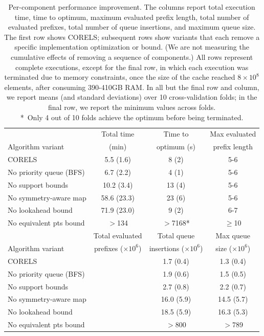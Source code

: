 \begin{table}[t!]
\centering
\begin{tabular}{l | c | c | c}
& Total time & Time to & Max evaluated \\
Algorithm variant & (min) & optimum (s) & prefix length \\
\hline
CORELS & 5.5 (1.6) & 8 (2) & 5-6 \\
No priority queue (BFS) & 6.7 (2.2) & 4 (1) & 5-6 \\
No support bounds & 10.2 (3.4) & 13 (4) & 5-6 \\
No symmetry-aware map & 58.6 (23.3) & 23 (6) & 5-6 \\
No lookahead bound & 71.9 (23.0) & 9 (2) & 6-7 \\
No equivalent pts bound & $>$134 & $>$7168* & $\ge$10 \\
\hline
\hline
 & Total evaluated & Total queue &  Max queue \\
Algorithm variant & prefixes ($\times 10^6$) & insertions ($\times 10^6$) & size ($\times 10^6$) \\
\hline
CORELS & & 1.7 (0.4) & 1.3 (0.4) \\
No priority queue (BFS) & & 1.9 (0.6) & 1.5 (0.5) \\
No support bounds  & & 2.7 (0.8) & 2.2 (0.7) \\
No symmetry-aware map & & 16.0 (5.9) & 14.5 (5.7) \\
No lookahead bound & & 18.5 (5.9) & 16.3 (5.3) \\
No equivalent pts bound & & $>$800 & $>$789
\end{tabular}
\caption{Per-component performance improvement.
%
The columns report total execution time,
time to optimum,  maximum evaluated prefix length,
total number of evaluated prefixes,
total number of queue insertions,
and maximum queue size.
%
The first row shows CORELS; subsequent rows show variants
that each remove a specific implementation optimization or bound.
%
(We are not measuring the cumulative effects of removing a sequence of components.)
%
All rows represent complete executions, except for the final row,
in which each execution was terminated due to memory constraints,
once the size of the cache reached ${8 \times 10^8}$ elements,
after consuming 390-410GB RAM.
%
In all but the final row and column, we report means
(and standard deviations) over 10 cross-validation folds;
in the final row, we report the minimum values across folds. \\
%
*~Only 4 out of 10 folds achieve the optimum before being terminated.
}
\vspace{4mm}
\label{tab:ablation}
\end{table}

